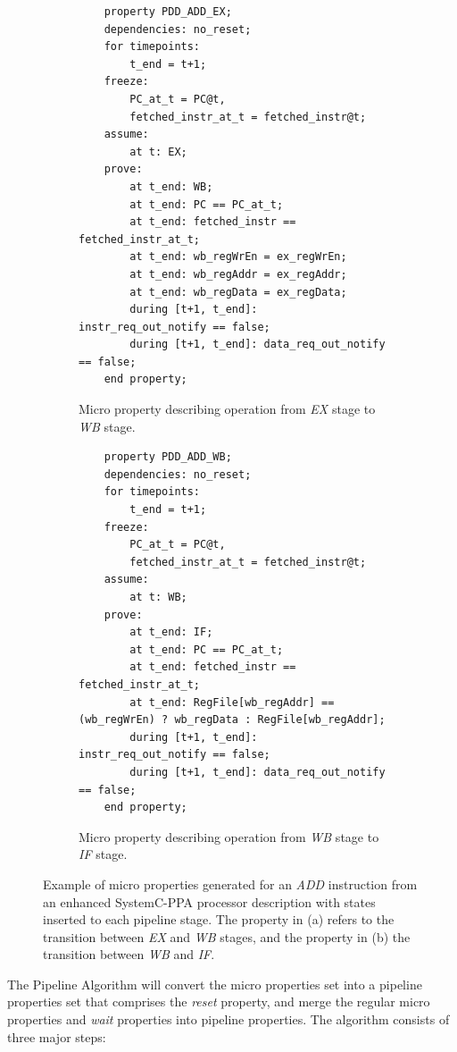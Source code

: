 \begin{figure}[htb!]
     \centering
     \begin{subfigure}[b]{\textwidth}
         \begin{lstlisting}
    property PDD_ADD_EX;
    dependencies: no_reset;
    for timepoints:
        t_end = t+1;
    freeze:
        PC_at_t = PC@t,
        fetched_instr_at_t = fetched_instr@t;
    assume:
        at t: EX;
    prove:
        at t_end: WB;
        at t_end: PC == PC_at_t;
        at t_end: fetched_instr == fetched_instr_at_t;
        at t_end: wb_regWrEn = ex_regWrEn;
        at t_end: wb_regAddr = ex_regAddr;
        at t_end: wb_regData = ex_regData;
        during [t+1, t_end]: instr_req_out_notify == false;
        during [t+1, t_end]: data_req_out_notify == false;
    end property;\end{lstlisting}
         \caption{Micro property describing operation from \textit{EX} stage to \textit{WB} stage.}
         \label{subfig:add-ex-micro-ppt}
     \end{subfigure}
     \hfill
     \begin{subfigure}[b]{\textwidth}
         \begin{lstlisting}
    property PDD_ADD_WB;
    dependencies: no_reset;
    for timepoints:
        t_end = t+1;
    freeze:
        PC_at_t = PC@t,
        fetched_instr_at_t = fetched_instr@t;
    assume:
        at t: WB;
    prove:
        at t_end: IF;
        at t_end: PC == PC_at_t;
        at t_end: fetched_instr == fetched_instr_at_t;
        at t_end: RegFile[wb_regAddr] == (wb_regWrEn) ? wb_regData : RegFile[wb_regAddr];
        during [t+1, t_end]: instr_req_out_notify == false;
        during [t+1, t_end]: data_req_out_notify == false;
    end property;\end{lstlisting}
         \caption{Micro property describing operation from \textit{WB} stage to \textit{IF} stage.}
         \label{subfig:add-wb-micro-ppt}
     \end{subfigure}
        \caption{Example of micro properties generated for an \textit{ADD} instruction from an enhanced SystemC-PPA processor description with states inserted to each pipeline stage. The property in (a) refers to the transition between \textit{EX} and \textit{WB} stages, and the property in (b) the transition between \textit{WB} and \textit{IF}.}
        \label{fig:add-ex-wb-micro-ppt}
\end{figure}

The Pipeline Algorithm will convert the micro properties set into a pipeline properties set that comprises the \textit{reset} property, and merge the regular micro properties and \textit{wait} properties into pipeline properties. The algorithm consists of three major steps:


